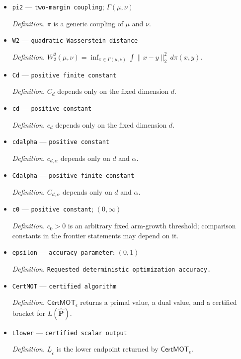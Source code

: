 \documentclass{article}
\begin{document}
\begin{itemize}
  \par\smallskip\noindent\emph{Definition.} \(\delta_0\) is the point mass at the origin.
  \item \texttt{pi2} --- \texttt{two-\allowbreak{}margin coupling}; \(\Gamma(\mu,\nu)\)
  \par\smallskip\noindent\emph{Definition.} \(\pi\) is a generic coupling of \(\mu\) and \(\nu\).
  \item \texttt{W2} --- \texttt{quadratic Wasserstein distance}
  \par\smallskip\noindent\emph{Definition.} \(W_2^2(\mu,\nu)=\inf_{\pi\in\Gamma(\mu,\nu)}\int\|x-y\|_2^2\,d\pi(x,y)\).
  \item \texttt{Cd} --- \texttt{positive finite constant}
  \par\smallskip\noindent\emph{Definition.} \(C_d\) depends only on the fixed dimension \(d\).
  \item \texttt{cd} --- \texttt{positive constant}
  \par\smallskip\noindent\emph{Definition.} \(c_d\) depends only on the fixed dimension \(d\).
  \item \texttt{cdalpha} --- \texttt{positive constant}
  \par\smallskip\noindent\emph{Definition.} \(c_{d,\alpha}\) depends only on \(d\) and \(\alpha\).
  \item \texttt{Cdalpha} --- \texttt{positive finite constant}
  \par\smallskip\noindent\emph{Definition.} \(C_{d,\alpha}\) depends only on \(d\) and \(\alpha\).
  \item \texttt{c0} --- \texttt{positive constant}; \((0,\infty)\)
  \par\smallskip\noindent\emph{Definition.} \(c_0>0\) is an arbitrary fixed arm-growth threshold; comparison constants in the frontier statements may depend on it.
  \item \texttt{epsilon} --- \texttt{accuracy parameter}; \((0,1)\)
  \par\smallskip\noindent\emph{Definition.} \texttt{Requested deterministic optimization accuracy.}
  \item \texttt{CertMOT} --- \texttt{certified algorithm}
  \par\smallskip\noindent\emph{Definition.} \(\mathsf{CertMOT}_\epsilon\) returns a primal value, a dual value, and a certified bracket for \(L(\widehat{\mathbf P})\).
  \item \texttt{Llower} --- \texttt{certified scalar output}
  \par\smallskip\noindent\emph{Definition.} \(\underline L_\epsilon\) is the lower endpoint returned by \(\mathsf{CertMOT}_\epsilon\).

\end{itemize}
\end{document}
